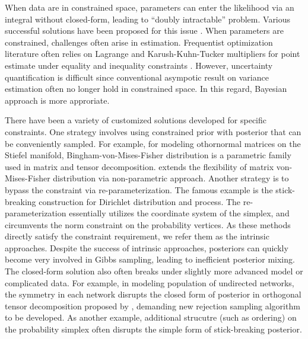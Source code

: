 \documentclass[10pt]{article}
\begin{document}
When data are in constrained space, parameters can enter the likelihood via an integral without closed-form, leading to ``doubly intractable'' problem. Various successful solutions have been proposed for this issue \citep{murray2012mcmc,rao2016data}. When parameters are constrained, challenges often arise in estimation. Frequentist optimization literature often relies on Lagrange and Karush-Kuhn-Tucker multipliers for point estimate under equality and inequality constraints \citep{boyd2004convex}. However, uncertainty quantification is difficult since conventional asympotic result on variance estimation often no longer hold in constrained space. In this regard, Bayesian approach is more approriate.

There have been a variety of customized solutions developed for specific constraints. One strategy involves using constrained prior with posterior that can be conveniently sampled. For example, for modeling othornormal matrices on the Stiefel manifold, Bingham-von-Mises-Fisher distribution \citep{khatri1977mises,hoff2009simulation} is a parametric family used in matrix and tensor decomposition. \cite{lin2016bayesstiefel} extends the flexibility of matrix von-Mises-Fisher distribution via non-parametric approach. Another strategy is to bypass the constraint via re-parameterization. The famous example is the stick-breaking construction for Dirichlet distribution and process. The re-parameterization essentially utilizes the coordinate system of the simplex, and circumvents the norm constraint on the probability vertices. As these methods directly satisfy the constraint requirement, we refer them as the intrinsic approaches. Despite the success of intrinsic approaches,  posteriors can quickly become very involved in Gibbs sampling, leading to inefficient posterior mixing. The closed-form solution also often breaks under slightly more advanced model or complicated data. For example, in modeling population of undirected networks, the symmetry in each network disrupts the closed form of posterior in orthogonal tensor decomposition proposed by \cite{hoff2016equivariant}, demanding new rejection sampling algorithm to be developed. As another example, additional strucutre (such as ordering) on the probability simplex often disrupts the simple form of stick-breaking posterior.
\end{document}
